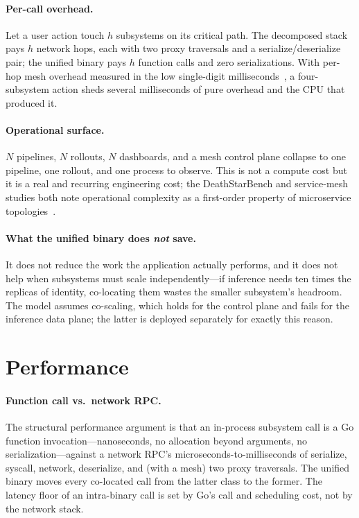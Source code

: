 \documentclass[11pt]{article}
\begin{document}
\paragraph{Per-call overhead.}
Let a user action touch $h$ subsystems on its critical path. The decomposed
stack pays $h$ network hops, each with two proxy traversals and a
serialize/deserialize pair; the unified binary pays $h$ function calls and
zero serializations. With per-hop mesh overhead measured in the low
single-digit milliseconds~\cite{istio_overhead}, a four-subsystem action
sheds several milliseconds of pure overhead and the CPU that produced it.

\paragraph{Operational surface.}
$N$ pipelines, $N$ rollouts, $N$ dashboards, and a mesh control plane
collapse to one pipeline, one rollout, and one process to observe. This is
not a compute cost but it is a real and recurring engineering cost; the
DeathStarBench and service-mesh studies both note operational complexity as
a first-order property of microservice topologies~\cite{deathstarbench,istio_overhead}.

\paragraph{What the unified binary does \emph{not} save.}
It does not reduce the work the application actually performs, and it does
not help when subsystems must scale independently---if inference needs ten
times the replicas of identity, co-locating them wastes the smaller
subsystem's headroom. The model assumes co-scaling, which holds for the
control plane and fails for the inference data plane; the latter is
deployed separately for exactly this reason.

\section{Performance}
\label{sec:perf}

\paragraph{Function call vs.\ network RPC.}
The structural performance argument is that an in-process subsystem call is
a Go function invocation---nanoseconds, no allocation beyond arguments, no
serialization---against a network RPC's microseconds-to-milliseconds of
serialize, syscall, network, deserialize, and (with a mesh) two proxy
traversals. The unified binary moves every co-located call from the latter
class to the former. The latency floor of an intra-binary call is set by
Go's call and scheduling cost, not by the network stack.
\end{document}
